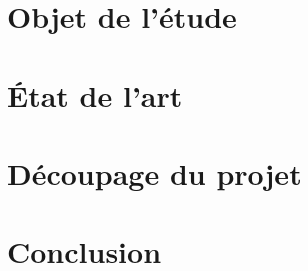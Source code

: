 \documentclass[11pt,a4paper]{article}
\begin{document}
\section{Objet de l'étude}
\clearpage

\section{État de l'art}
\clearpage

\section{Découpage du projet}
\clearpage

\section{Conclusion}
\clearpage

\begin{thebibliography}{9}
\end{thebibliography}
\end{document}
